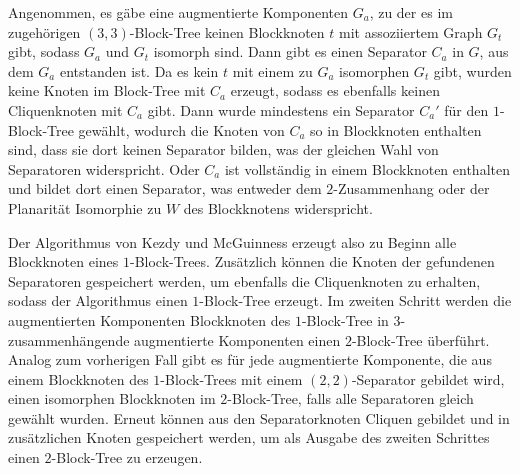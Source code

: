 Angenommen, es gäbe eine augmentierte Komponenten $G_a$, zu der es im zugehörigen $(3, 3)$-Block-Tree keinen Blockknoten $t$ mit assoziiertem Graph $G_t$ gibt, sodass $G_a$ und $G_t$ isomorph sind.
Dann gibt es einen Separator $C_a$ in $G$, aus dem $G_a$ entstanden ist.
Da es kein $t$ mit einem zu $G_a$ isomorphen $G_t$ gibt, wurden keine Knoten im Block-Tree mit $C_a$ erzeugt, sodass es ebenfalls keinen Cliquenknoten mit $C_a$ gibt.
Dann wurde mindestens ein Separator $C_a'$ für den $1$-Block-Tree gewählt, wodurch die Knoten von $C_a$ so in Blockknoten enthalten sind, dass sie dort keinen Separator bilden, was der gleichen Wahl von Separatoren widerspricht.
Oder $C_a$ ist vollständig in einem Blockknoten enthalten und bildet dort einen Separator, was entweder dem $2$-Zusammenhang oder der Planarität \bzw Isomorphie zu $W$ des Blockknotens widerspricht.

Der Algorithmus von Kezdy und McGuinness erzeugt also zu Beginn alle Blockknoten eines $1$-Block-Trees.
Zusätzlich können die Knoten der gefundenen Separatoren gespeichert werden, um ebenfalls die Cliquenknoten zu erhalten, sodass der Algorithmus einen $1$-Block-Tree erzeugt.
Im zweiten Schritt werden die augmentierten Komponenten \bzw Blockknoten des $1$-Block-Tree in $3$-zusammenhängende augmentierte Komponenten \bzw einen $2$-Block-Tree überführt.
Analog zum vorherigen Fall gibt es für jede augmentierte Komponente, die aus einem Blockknoten des $1$-Block-Trees mit einem $(2, 2)$-Separator gebildet wird, einen isomorphen Blockknoten im $2$-Block-Tree, falls alle Separatoren gleich gewählt wurden.
Erneut können aus den Separatorknoten Cliquen gebildet und in zusätzlichen Knoten gespeichert werden, um als Ausgabe des zweiten Schrittes einen $2$-Block-Tree zu erzeugen.

